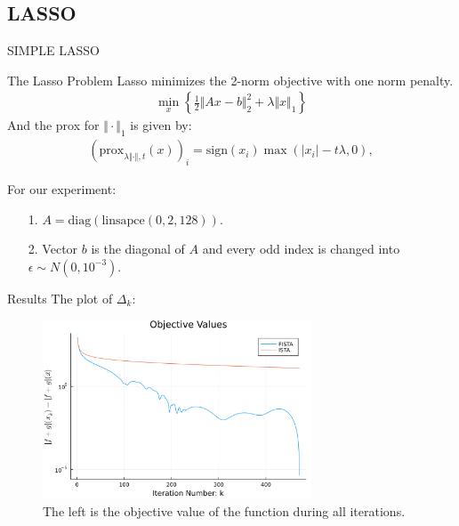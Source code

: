 \documentclass[11pt]{beamer}
\begin{document}
    \subsection{LASSO}
        \begin{frame}{SIMPLE LASSO}
            \begin{block}{The Lasso Problem}
                Lasso minimizes the 2-norm objective with one norm penalty. 
                \begin{align*}
                    \min_{x}\left\lbrace
                        \frac{1}{2}\Vert Ax - b\Vert^2_2 + \lambda\Vert x\Vert_1    
                    \right\rbrace
                \end{align*}
                And the prox for $\Vert \cdot\Vert_1$ is given by: 
                \begin{align*}
                    (\text{prox}_{\lambda\Vert \cdot \Vert, t}(x))_i
                    = 
                    \text{sign}(x_i)\max(|x_i| - t\lambda, 0), 
                \end{align*}
            \end{block}
            For our experiment: 
            \begin{itemize}
                \item [1.] $A = \text{diag}(\text{linsapce}(0, 2, 128))$. 
                \item [2.] Vector $b$ is the diagonal of $A$ and every odd index is changed into $\epsilon \sim  N(0, 10^{-3})$. 
            \end{itemize}
        \end{frame}
        \begin{frame}{Results}
            The plot of $\Delta_k$: 
            \begin{figure}[h]
                \centering
                \includegraphics[width=8cm]{simple_lass_obj.png}
                \caption{The left is the objective value of the function during all iterations.}
            \end{figure}
        \end{frame}
\end{document}
